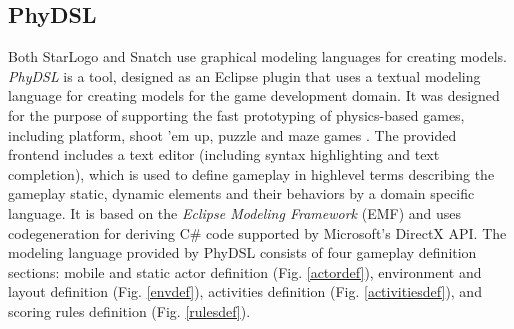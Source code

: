 \documentclass[runningheads,a4paper]{llncs}
\begin{document}
  
  \subsection{PhyDSL}
  Both StarLogo and Snatch use graphical modeling languages for creating models. 
  \emph{PhyDSL} is a tool, designed as an Eclipse\cite{eclipse} plugin that uses a textual modeling language for creating models for the game development domain.
  It was designed for the purpose of supporting the fast prototyping of physics-based games, including platform, shoot ’em up, 
  puzzle and maze games \cite{guana2014phydsl}. 
  The provided frontend includes a text editor (including syntax highlighting and text completion), which is used to define gameplay in highlevel
  terms describing the gameplay static, dynamic elements and their behaviors by a domain specific language.  
  It is based on the \emph{Eclipse Modeling Framework}\cite{} (EMF) and uses codegeneration for deriving C\# code supported by Microsoft’s
  DirectX API. 
  The modeling language provided by PhyDSL consists of four gameplay definition sections: mobile and
  static actor definition (Fig. \ref{actordef}), 
  environment and layout definition (Fig. \ref{envdef}), 
  activities definition (Fig. \ref{activitiesdef}), 
  and scoring rules definition (Fig. \ref{rulesdef}).
  
\end{document}
